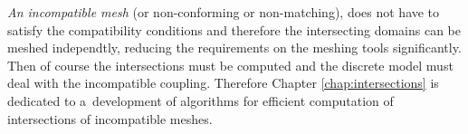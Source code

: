 

\emph{An incompatible mesh} (or non-conforming or non-matching), does not have to satisfy the compatibility conditions
and therefore the intersecting domains can be meshed independtly, reducing the requirements on the meshing tools significantly.
Then of course the intersections must be computed and the discrete model must deal with the incompatible coupling.
Therefore Chapter \ref{chap:intersections} is dedicated to a~development of algorithms
for efficient computation of intersections of incompatible meshes.




